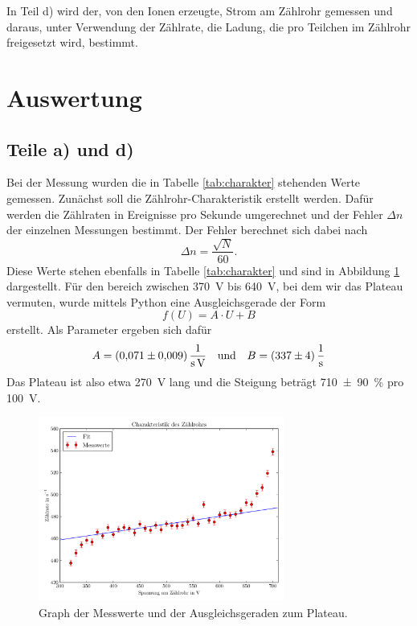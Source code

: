 \documentclass[
  bibliography=totoc,     %
  captions=tableheading,  %
  titlepage=firstiscover, %
]{scrartcl}
\begin{document}
In Teil d) wird der, von den Ionen erzeugte, Strom am Zählrohr gemessen und daraus,
unter Verwendung der Zählrate, die Ladung, die pro Teilchen im Zählrohr freigesetzt
wird, bestimmt.
\section{Auswertung}
\label{sec:auswertung}
\subsection{Teile a) und d)}
Bei der Messung wurden die in Tabelle \ref{tab:charakter} stehenden Werte gemessen.
Zunächst soll die Zählrohr-Charakteristik erstellt werden.
Dafür werden die Zählraten in Ereignisse pro Sekunde umgerechnet und
der Fehler $\Delta n$ der einzelnen Messungen bestimmt.
Der Fehler berechnet sich dabei nach
\begin{equation}
  \Delta n = \frac{\sqrt{N}}{60}.
\end{equation}
Diese Werte stehen ebenfalls in Tabelle \ref{tab:charakter} und sind in Abbildung \ref{fig:plot1} dargestellt.
Für den bereich zwischen \SI{370}{\volt} bis \SI{640}{\volt}, bei dem wir das
Plateau vermuten, wurde mittels Python eine Ausgleichsgerade der Form
\begin{equation}
  f(U) = A \cdot U + B
\end{equation}
erstellt.
Als Parameter ergeben sich dafür
\begin{align}
  A &= \SI{0.071\pm0.009}{\per\second\per\volt} & &\text{und} &B = \SI{337\pm4}{\per\second}
\end{align}
Das Plateau ist also etwa \SI{270}{\volt} lang und die Steigung beträgt
\SI{710(90)}{\percent} pro \SI{100}{\volt}.
\begin{figure}
  \centering
  \includegraphics[width=0.72\textwidth]{Plot.pdf}
  \caption{Graph der Messwerte und der Ausgleichsgeraden zum Plateau.}
  \label{fig:plot1}
\end{figure}
\end{document}
